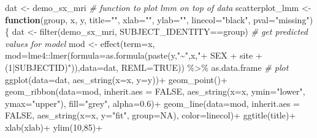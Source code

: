 \documentclass[
]{article}
\newenvironment{Shaded}{\begin{snugshade}}{\end{snugshade}}
\newcommand{\AttributeTok}[1]{\textcolor[rgb]{0.77,0.63,0.00}{#1}}
\newcommand{\CommentTok}[1]{\textcolor[rgb]{0.56,0.35,0.01}{\textit{#1}}}
\newcommand{\ConstantTok}[1]{\textcolor[rgb]{0.00,0.00,0.00}{#1}}
\newcommand{\ControlFlowTok}[1]{\textcolor[rgb]{0.13,0.29,0.53}{\textbf{#1}}}
\newcommand{\DecValTok}[1]{\textcolor[rgb]{0.00,0.00,0.81}{#1}}
\newcommand{\FloatTok}[1]{\textcolor[rgb]{0.00,0.00,0.81}{#1}}
\newcommand{\FunctionTok}[1]{\textcolor[rgb]{0.00,0.00,0.00}{#1}}
\newcommand{\NormalTok}[1]{#1}
\newcommand{\OtherTok}[1]{\textcolor[rgb]{0.56,0.35,0.01}{#1}}
\newcommand{\SpecialCharTok}[1]{\textcolor[rgb]{0.00,0.00,0.00}{#1}}
\newcommand{\StringTok}[1]{\textcolor[rgb]{0.31,0.60,0.02}{#1}}
\begin{document}
\begin{Shaded}
\begin{Highlighting}[]
\NormalTok{dat }\OtherTok{\textless{}{-}}\NormalTok{ demo\_sx\_mri}
\CommentTok{\# function to plot lmm on top of data}
\NormalTok{scatterplot\_lmm }\OtherTok{\textless{}{-}} \ControlFlowTok{function}\NormalTok{(group, x, y, }\AttributeTok{title=}\StringTok{""}\NormalTok{, }\AttributeTok{xlab=}\StringTok{""}\NormalTok{, }\AttributeTok{ylab=}\StringTok{""}\NormalTok{, }\AttributeTok{linecol=}\StringTok{"black"}\NormalTok{, }\AttributeTok{pval=}\StringTok{"missing"}\NormalTok{)\{}
\NormalTok{  dat }\OtherTok{\textless{}{-}} \FunctionTok{filter}\NormalTok{(demo\_sx\_mri, SUBJECT\_IDENTITY}\SpecialCharTok{==}\NormalTok{group)}
  \CommentTok{\# get predicted values for model}
\NormalTok{  mod }\OtherTok{\textless{}{-}} \FunctionTok{effect}\NormalTok{(}\AttributeTok{term=}\NormalTok{x, }\AttributeTok{mod=}\NormalTok{lme4}\SpecialCharTok{::}\FunctionTok{lmer}\NormalTok{(}\AttributeTok{formula=}\FunctionTok{as.formula}\NormalTok{(}\FunctionTok{paste}\NormalTok{(y,}\StringTok{"\textasciitilde{}"}\NormalTok{,x,}\StringTok{"+ SEX + site + (1|SUBJECTID)"}\NormalTok{)),}\AttributeTok{data=}\NormalTok{dat, }\AttributeTok{REML=}\ConstantTok{TRUE}\NormalTok{)) }\SpecialCharTok{\%\textgreater{}\%}\NormalTok{ as.data.frame}
  \CommentTok{\# plot }
  \FunctionTok{ggplot}\NormalTok{(}\AttributeTok{data=}\NormalTok{dat, }\FunctionTok{aes\_string}\NormalTok{(}\AttributeTok{x=}\NormalTok{x, }\AttributeTok{y=}\NormalTok{y))}\SpecialCharTok{+}
    \FunctionTok{geom\_point}\NormalTok{()}\SpecialCharTok{+}
    \FunctionTok{geom\_ribbon}\NormalTok{(}\AttributeTok{data=}\NormalTok{mod, }\AttributeTok{inherit.aes =} \ConstantTok{FALSE}\NormalTok{, }\FunctionTok{aes\_string}\NormalTok{(}\AttributeTok{x=}\NormalTok{x, }\AttributeTok{ymin=}\StringTok{"lower"}\NormalTok{, }\AttributeTok{ymax=}\StringTok{"upper"}\NormalTok{), }\AttributeTok{fill=}\StringTok{"grey"}\NormalTok{, }\AttributeTok{alpha=}\FloatTok{0.6}\NormalTok{)}\SpecialCharTok{+}
    \FunctionTok{geom\_line}\NormalTok{(}\AttributeTok{data=}\NormalTok{mod, }\AttributeTok{inherit.aes =} \ConstantTok{FALSE}\NormalTok{, }\FunctionTok{aes\_string}\NormalTok{(}\AttributeTok{x=}\NormalTok{x, }\AttributeTok{y=}\StringTok{"fit"}\NormalTok{, }\AttributeTok{group=}\ConstantTok{NA}\NormalTok{), }\AttributeTok{color=}\NormalTok{linecol)}\SpecialCharTok{+}
    \FunctionTok{ggtitle}\NormalTok{(title)}\SpecialCharTok{+}
    \FunctionTok{xlab}\NormalTok{(xlab)}\SpecialCharTok{+}
    \FunctionTok{ylim}\NormalTok{(}\DecValTok{10}\NormalTok{,}\DecValTok{85}\NormalTok{)}\SpecialCharTok{+}

\end{Highlighting}
\end{Shaded}
\end{document}
